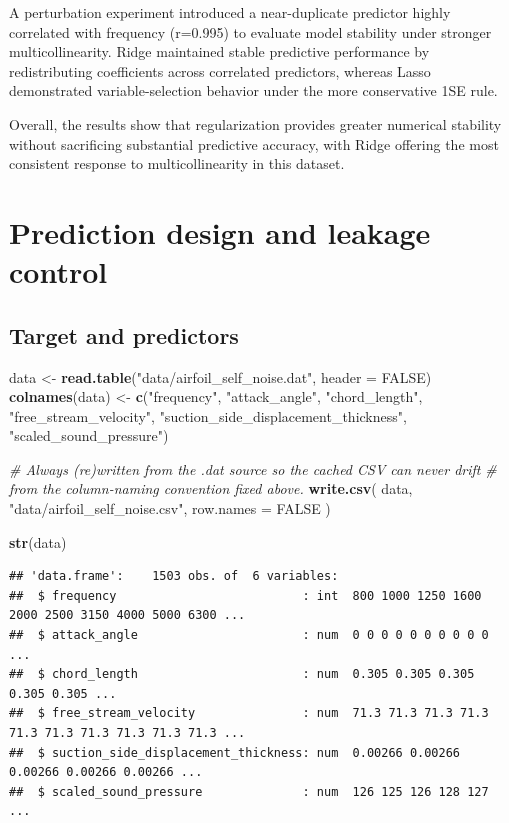 \documentclass[
  11pt,
]{article}
\newenvironment{Shaded}{\begin{snugshade}}{\end{snugshade}}
\newcommand{\AttributeTok}[1]{\textcolor[rgb]{0.13,0.29,0.53}{#1}}
\newcommand{\CommentTok}[1]{\textcolor[rgb]{0.56,0.35,0.01}{\textit{#1}}}
\newcommand{\ConstantTok}[1]{\textcolor[rgb]{0.56,0.35,0.01}{#1}}
\newcommand{\FunctionTok}[1]{\textcolor[rgb]{0.13,0.29,0.53}{\textbf{#1}}}
\newcommand{\NormalTok}[1]{#1}
\newcommand{\OtherTok}[1]{\textcolor[rgb]{0.56,0.35,0.01}{#1}}
\newcommand{\StringTok}[1]{\textcolor[rgb]{0.31,0.60,0.02}{#1}}
\begin{document}
A perturbation experiment introduced a near-duplicate predictor highly
correlated with frequency (r=0.995) to evaluate model stability under
stronger multicollinearity. Ridge maintained stable predictive
performance by redistributing coefficients across correlated predictors,
whereas Lasso demonstrated variable-selection behavior under the more
conservative 1SE rule.

Overall, the results show that regularization provides greater numerical
stability without sacrificing substantial predictive accuracy, with
Ridge offering the most consistent response to multicollinearity in this
dataset.

\section{Prediction design and leakage
control}\label{prediction-design-and-leakage-control}

\subsection{Target and predictors}\label{target-and-predictors}

\begin{Shaded}
\begin{Highlighting}[]
\NormalTok{data }\OtherTok{\textless{}{-}} \FunctionTok{read.table}\NormalTok{(}\StringTok{"data/airfoil\_self\_noise.dat"}\NormalTok{, }\AttributeTok{header =} \ConstantTok{FALSE}\NormalTok{)}
\FunctionTok{colnames}\NormalTok{(data) }\OtherTok{\textless{}{-}} \FunctionTok{c}\NormalTok{(}\StringTok{"frequency"}\NormalTok{, }\StringTok{"attack\_angle"}\NormalTok{, }\StringTok{"chord\_length"}\NormalTok{, }\StringTok{"free\_stream\_velocity"}\NormalTok{, }\StringTok{"suction\_side\_displacement\_thickness"}\NormalTok{, }\StringTok{"scaled\_sound\_pressure"}\NormalTok{)}

\CommentTok{\# Always (re)written from the .dat source so the cached CSV can never drift}
\CommentTok{\# from the column{-}naming convention fixed above.}
\FunctionTok{write.csv}\NormalTok{(}
\NormalTok{  data,}
  \StringTok{"data/airfoil\_self\_noise.csv"}\NormalTok{,}
  \AttributeTok{row.names =} \ConstantTok{FALSE}
\NormalTok{)}

\FunctionTok{str}\NormalTok{(data)}
\end{Highlighting}
\end{Shaded}

\begin{verbatim}
## 'data.frame':    1503 obs. of  6 variables:
##  $ frequency                          : int  800 1000 1250 1600 2000 2500 3150 4000 5000 6300 ...
##  $ attack_angle                       : num  0 0 0 0 0 0 0 0 0 0 ...
##  $ chord_length                       : num  0.305 0.305 0.305 0.305 0.305 ...
##  $ free_stream_velocity               : num  71.3 71.3 71.3 71.3 71.3 71.3 71.3 71.3 71.3 71.3 ...
##  $ suction_side_displacement_thickness: num  0.00266 0.00266 0.00266 0.00266 0.00266 ...
##  $ scaled_sound_pressure              : num  126 125 126 128 127 ...
\end{verbatim}
\end{document}
